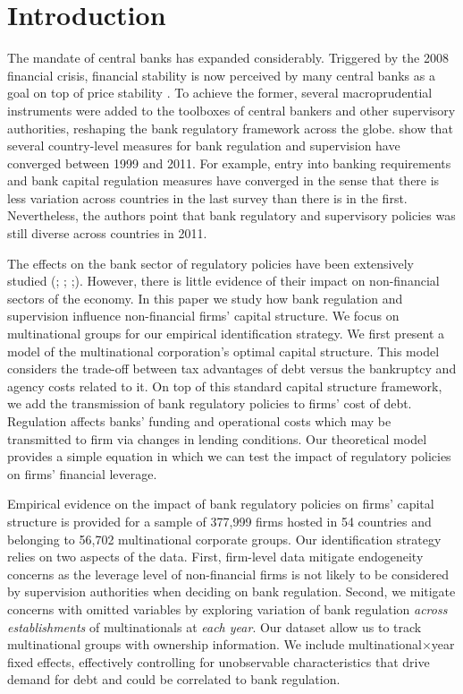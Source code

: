 \documentclass[12pt]{article}
\begin{document}
	\doublespacing
	
	
	\section{Introduction} \label{sec:introduction}
	The mandate of central banks has expanded considerably. Triggered by the 2008 financial crisis, financial stability is now perceived by many central banks as a goal on top of price stability \citep*{blinder2017necessity}. To achieve the former, several macroprudential instruments were added to the toolboxes of central bankers and other supervisory authorities, reshaping the bank regulatory framework across the globe. \cite*{barth2013bank} show that several country-level measures for bank regulation and supervision have converged between 1999 and 2011. For example, entry into banking requirements and bank capital regulation measures have converged in the sense that there is less variation across countries in the last survey than there is in the first. Nevertheless, the authors point that bank regulatory and supervisory policies was still diverse across countries in 2011. 
	
	The effects on the bank sector of regulatory policies have been extensively studied (\cite*{barth2013}; \cite*{anginer2014does};  \cite*{caprio2014macro};\cite*{demirguc2013bank}). However, there is little evidence of their impact on non-financial sectors of the economy. In this paper we study how bank regulation and supervision influence non-financial firms' capital structure. We focus on multinational groups for our empirical identification strategy. We first present a model of the multinational corporation's optimal capital structure. This model considers the trade-off between tax advantages of debt versus the bankruptcy and agency costs related to it. On top of this standard capital structure framework, we add the transmission of bank regulatory policies to firms' cost of debt. Regulation affects banks' funding and operational costs which may be transmitted to firm via changes in lending conditions. Our theoretical model provides a simple equation in which we can test the impact of regulatory policies on firms' financial leverage. 
	
	Empirical evidence on the impact of bank regulatory policies on firms' capital structure is provided for a sample of 377,999 firms hosted in 54 countries and belonging to 56,702 multinational corporate groups. Our identification strategy relies on two aspects of the data. First, firm-level data mitigate endogeneity concerns as the leverage level of non-financial firms is not likely to be considered by supervision authorities when deciding on bank regulation. Second, we mitigate concerns with omitted variables by exploring variation of bank regulation \textit{across establishments} of multinationals at \textit{each year}. Our dataset allow us to track multinational groups with ownership information. We include multinational$\times$year fixed effects, effectively controlling for unobservable characteristics that drive demand for debt and could be correlated to bank regulation. 
	
\end{document}
